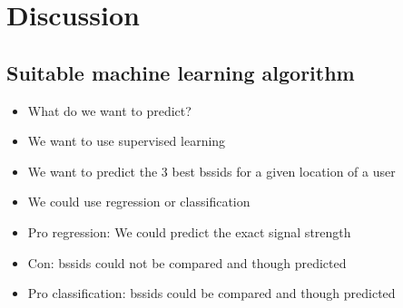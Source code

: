 \chapter{Discussion}

\section{Suitable machine learning algorithm}
    \begin{itemize}
        \item What do we want to predict?
        \item We want to use supervised learning
        \item We want to predict the 3 best bssids for a given location of a user
        \item We could use regression or classification
        \item Pro regression: We could predict the exact signal strength
        \item Con: bssids could not be compared and though predicted
        \item Pro classification: bssids could be compared and though predicted
    \end{itemize}

